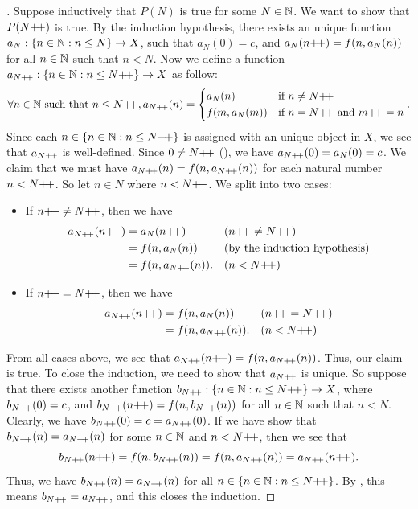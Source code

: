 \begin{proof}[]
  Suppose inductively that \(P(N)\) is true for some \(N \in \mathbb{N}\).
  We want to show that \(P(N{+}\!{+})\) is true.
  By the induction hypothesis, there exists an unique function \(a_N : \left\lbrace n \in \mathbb{N} : n \leq N\right\rbrace \to X\), such that \(a_N(0) = c\), and \(a_N(n{+}\!{+}) = f(n, a_N(n))\) for all \(n \in \mathbb{N}\) such that \(n < N\).
  Now we define a function \(a_{N{+}\!{+}} : \left\lbrace n \in \mathbb{N} : n \leq N{+}\!{+}\right\rbrace \to X\) as follow:
  \[
    \forall n \in \mathbb{N} \text{ such that } n \leq N{+}\!{+}, a_{N{+}\!{+}}(n) = \begin{dcases}
      a_N(n)       & \text{if } n \neq N{+}\!{+}                    \\
      f(m, a_N(m)) & \text{if } n = N{+}\!{+} \text{ and } m{+}\!{+} = n
    \end{dcases}.
  \]
  Since each \(n \in \left\lbrace n \in \mathbb{N} : n \leq N{+}\!{+}\right\rbrace\) is assigned with an unique object in \(X\), we see that \(a_{N{+}\!{+}}\) is well-defined.
  Since \(0 \neq N{+}\!{+}\) (), we have \(a_{N{+}\!{+}}(0) = a_N(0) = c\).
  We claim that we must have \(a_{N{+}\!{+}}(n) = f(n, a_{N{+}\!{+}}(n))\) for each natural number \(n < N{+}\!{+}\).
  So let \(n \in N\) where \(n < N{+}\!{+}\).
  We split into two cases:
  \begin{itemize}
    \item If \(n{+}\!{+} \neq N{+}\!{+}\), then we have
          \begin{align*}
            a_{N{+}\!{+}}(n{+}\!{+}) & = a_N(n{+}\!{+})          &  & (n{+}\!{+} \neq N{+}\!{+}) \\
                           & = f(n, a_N(n))       &  & \text{(by the induction hypothesis)}            \\
                           & = f(n, a_{N{+}\!{+}}(n)). &  & (n < N{+}\!{+})
          \end{align*}
    \item If \(n{+}\!{+} = N{+}\!{+}\), then we have
          \begin{align*}
            a_{N{+}\!{+}}(n{+}\!{+}) & = f(n, a_N(n))       &  & (n{+}\!{+} = N{+}\!{+}) \\
                           & = f(n, a_{N{+}\!{+}}(n)). &  & (n < N{+}\!{+})
          \end{align*}
  \end{itemize}
  From all cases above, we see that \(a_{N{+}\!{+}}(n{+}\!{+}) = f(n, a_{N{+}\!{+}}(n))\).
  Thus, our claim is true.
  To close the induction, we need to show that \(a_{N{+}\!{+}}\) is unique.
  So suppose that there exists another function \(b_{N{+}\!{+}} : \left\lbrace n \in \mathbb{N} : n \leq N{+}\!{+}\right\rbrace \to X\), where \(b_{N{+}\!{+}}(0) = c\), and \(b_{N{+}\!{+}}(n{+}\!{+}) = f(n, b_{N{+}\!{+}}(n))\) for all \(n \in \mathbb{N}\) such that \(n < N\).
  Clearly, we have \(b_{N{+}\!{+}}(0) = c = a_{N{+}\!{+}}(0)\).
  If we have show that \(b_{N{+}\!{+}}(n) = a_{N{+}\!{+}}(n)\) for some \(n \in \mathbb{N}\) and \(n < N{+}\!{+}\), then we see that
  \[
    b_{N{+}\!{+}}(n{+}\!{+}) = f(n, b_{N{+}\!{+}}(n)) = f(n, a_{N{+}\!{+}}(n)) = a_{N{+}\!{+}}(n{+}\!{+}).
  \]
  Thus, we have \(b_{N{+}\!{+}}(n) = a_{N{+}\!{+}}(n)\) for all \(n \in \left\lbrace n \in \mathbb{N} : n \leq N{+}\!{+}\right\rbrace\).
  By , this means \(b_{N{+}\!{+}} = a_{N{+}\!{+}}\), and this closes the induction.


\end{proof}
